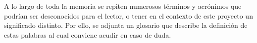 A lo largo de toda la memoria se repiten numerosos términos y acrónimos que podrían
ser desconocidos para el lector, o tener en el contexto de este proyecto un significado distinto. Por ello, se adjunta un glosario que describe la definición de estas palabras al cual conviene acudir en caso de duda.






































